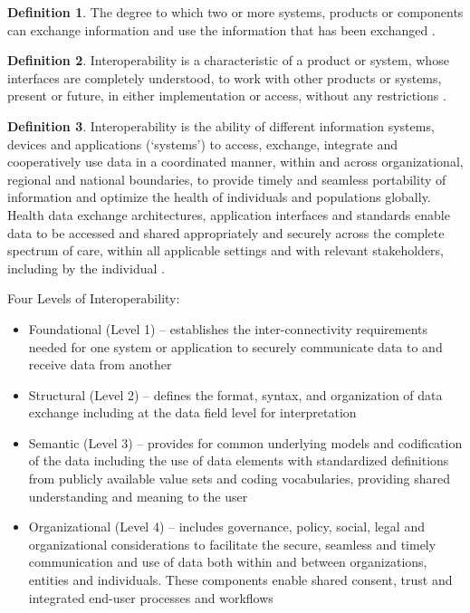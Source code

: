 \documentclass[letterpaper, cleveref]{lipics-v2019}
\theoremstyle{definition}
\newtheorem{defn}{Definition}
\begin{document}
\begin{defn}
  \label{InteroperabilitySelected} The degree to which two or more systems,
  products or components can exchange information and use the information
  that has been exchanged \citep{ISO/IEC25010}. %
\end{defn}

\begin{defn}
  Interoperability is a characteristic of a product or system, whose
  interfaces are completely understood, to work with other products or
  systems, present or future, in either implementation or access, without
  any restrictions \citep{AFUL2019}.
\end{defn}

\begin{defn}
  Interoperability is the ability of different information systems, devices and
  applications (‘systems’) to access, exchange, integrate and cooperatively use
  data in a coordinated manner, within and across organizational, regional and
  national boundaries, to provide timely and seamless portability of information
  and optimize the health of individuals and populations globally. Health data
  exchange architectures, application interfaces and standards enable data to be
  accessed and shared appropriately and securely across the complete spectrum of
  care, within all applicable settings and with relevant stakeholders, including
  by the individual \citep{HIMSS2019}.
	
  Four Levels of Interoperability:
  \begin{itemize}
  \item Foundational (Level 1) – establishes the inter-connectivity requirements
    needed for one system or application to securely communicate data to and
    receive data from another
		
  \item Structural (Level 2) – defines the format, syntax, and organization of
    data exchange including at the data field level for interpretation
		
  \item Semantic (Level 3) – provides for common underlying models and
    codification of the data including the use of data elements with
    standardized definitions from publicly available value sets and coding
    vocabularies, providing shared understanding and meaning to the user
		
  \item Organizational (Level 4) – includes governance, policy, social, legal
    and organizational considerations to facilitate the secure, seamless and
    timely communication and use of data both within and between organizations,
    entities and individuals. These components enable shared consent, trust and
    integrated end-user processes and workflows
  \end{itemize}
\end{defn}
\end{document}
